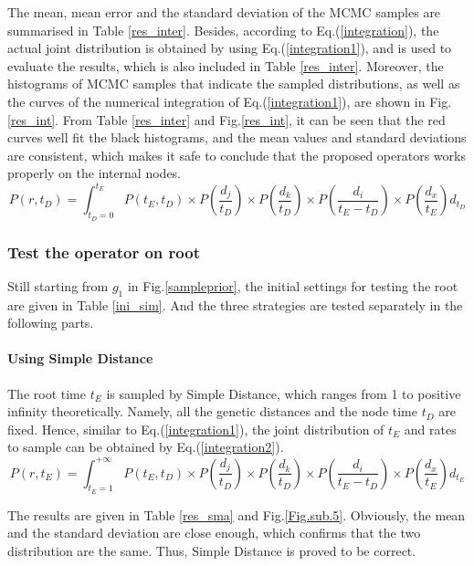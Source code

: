 \documentclass{bmcart}
\begin{document}
The mean, mean error and the standard deviation of the MCMC samples are summarised in Table \ref{res_inter}. Besides, according to Eq.(\ref{integration}), the actual joint distribution is obtained by using Eq.(\ref{integration1}), and is used to evaluate the results, which is also included in Table \ref{res_inter}. Moreover, the histograms of MCMC samples that indicate the sampled distributions, as well as the curves of the numerical integration of Eq.(\ref{integration1}), are shown in Fig.\ref{res_int}. From Table \ref{res_inter} and Fig.\ref{res_int}, it can be seen that the red curves well fit the black histograms, and the mean values and standard deviations are consistent, which makes it safe to conclude that the proposed operators works properly on the internal nodes.
\begin{equation}
\label{integration1}
P(r,{t_D}) = \int_{{t_D} = 0}^{{t_E}} {P({t_E},{t_D}) \times P(\frac{{{d_j}}}{{{t_D}}}) \times P(\frac{{{d_k}}}{{{t_D}}}) \times P(\frac{{{d_i}}}{{{t_E} - {t_D}}}) \times P(\frac{{{d_x}}}{{{t_E}}}){d_{t_D}}}
\end{equation}
\subsubsection*{Test the operator on root}
Still starting from $g_1$ in Fig.\ref{sampleprior}, the initial settings for testing the root are given in Table \ref{ini_sim}. And the three strategies are tested separately in the following parts.

\paragraph*{Using Simple Distance}

The root time $t_E$ is sampled by Simple Distance, which ranges from 1 to positive infinity theoretically. Namely, all the genetic distances and the node time $t_D$  are fixed. Hence, similar to Eq.(\ref{integration1}), the joint distribution of $t_E$ and rates to sample can be obtained by Eq.(\ref{integration2}).
\begin{equation}
\label{integration2}
P(r,{t_E}) = \int_{{t_E} = 1}^{ + \infty } {P({t_E},{t_D}) \times P(\frac{{{d_j}}}{{{t_D}}}) \times P(\frac{{{d_k}}}{{{t_D}}}) \times P(\frac{{{d_i}}}{{{t_E} - {t_D}}}) \times P(\frac{{{d_x}}}{{{t_E}}}){d_{t_E}}}
\end{equation}

The results are given in Table \ref{res_sma} and Fig.\ref{Fig.sub.5}. Obviously, the mean and the standard deviation are close enough, which confirms that the two distribution are the same. Thus, Simple Distance is proved to be correct.
\end{document}
